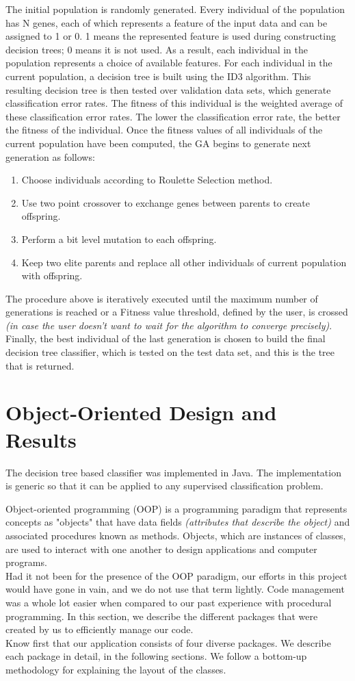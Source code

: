 \documentclass[conference]{IEEEtran}
\begin{document}
The initial population is
randomly generated. Every individual of the population has N
genes, each of which represents a feature of the input data and
can be assigned to 1 or 0. 1 means the represented feature is used
during constructing decision trees; 0 means it is not used. As a
result, each individual in the population represents a choice of
available features. For each individual in the current population, a
decision tree is built using the ID3 algorithm. This resulting
decision tree is then tested over validation data sets, which
generate classification error rates. The fitness of this
individual is the weighted average of these classification error rates.
The lower the classification error rate, the better the fitness of the
individual.
Once the fitness values of all individuals of the current population
have been computed, the GA begins to generate next generation
as follows:
\begin{enumerate}
\item{}Choose individuals according to Roulette Selection method.
\item{}Use two point crossover to exchange genes between parents to
create offspring.
\item{}Perform a bit level mutation to each offspring.
\item{}Keep two elite parents and replace all other individuals of
current population with offspring.
\end{enumerate}
The procedure above is iteratively executed until the maximum
number of generations is reached or a Fitness value threshold, defined by the user, is crossed \textit{(in case the user doesn't want to wait for the algorithm to converge precisely)}. Finally, the best
individual of the last generation is chosen to build the final
decision tree classifier, which is tested on the test data set, and this is the tree that is returned.

\section{Object-Oriented Design and Results}
The decision tree based classifier was implemented in Java. The implementation is generic so that it can be applied to any supervised classification problem.


Object-oriented programming (OOP) is a programming paradigm that represents concepts as "objects" that have data fields \textit{(attributes that describe the object)} and associated procedures known as methods. Objects, which are instances of classes, are used to interact with one another to design applications and computer programs.
\\Had it not been for the presence of the OOP paradigm, our efforts in this project would have gone in vain, and we do not use that term lightly. Code management was a whole lot easier when compared to our past experience with procedural programming. In this section, we describe the different packages that were created by us to efficiently manage our code.\\
Know first that our application consists of four diverse packages. We describe each package in detail, in the following sections. We follow a bottom-up methodology for explaining the layout of the classes.
\end{document}
